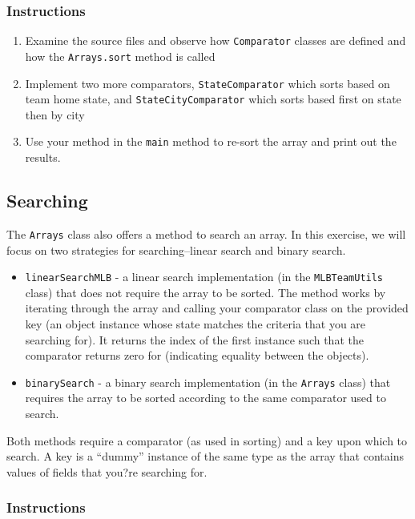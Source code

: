 \documentclass[12pt]{scrartcl}
\begin{document}
\subsubsection*{Instructions}

\begin{enumerate}
  \item Examine the source files and observe how \texttt{Comparator} 
  	classes are defined and how the \texttt{Arrays.sort} method is called
  \item Implement two more comparators, \texttt{StateComparator} 
	which sorts based on team home state, and \texttt{StateCityComparator} 
	which sorts based first on state then by city
  \item Use your method in the \texttt{main} method to re-sort the array 
	and print out the results.
\end{enumerate}
	
\subsection{Searching}

The \texttt{Arrays} class also offers a method to search an array.  
In this exercise, we will focus on two strategies for searching--linear search 
and binary search.
\begin{itemize}
  \item \texttt{linearSearchMLB} - a linear search implementation 
  	(in the \texttt{MLBTeamUtils} class) that does not require the 
	array to be sorted.  The method works by iterating through the array 
	and calling your comparator class on the provided key (an object instance 
	whose state matches the criteria that you are searching for).  It returns
	the index of the first instance such that the comparator returns zero for 
	(indicating equality between the objects).
  \item \texttt{binarySearch} - a binary search implementation (in the 
	\texttt{Arrays} class) that requires the array to be sorted according 
	to the same comparator used to search.  
\end{itemize}

Both methods require a comparator (as used in sorting) and a key upon 
which to search.  A key is a ``dummy'' instance of the same type as the 
array that contains values of fields that you?re searching for.

\subsubsection*{Instructions}
\end{document}
